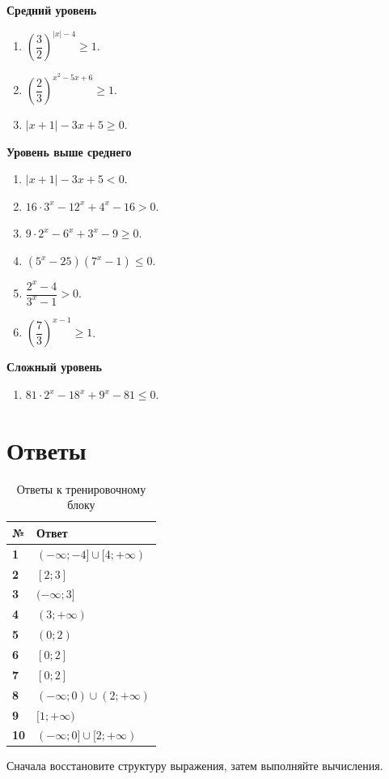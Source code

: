 \documentclass[a4paper,12pt]{article}
\begin{document}
\textbf{Средний уровень}
\begin{enumerate}
  \item $\left(\dfrac32\right)^{|x|-4}\ge1$.
  \item $\left(\dfrac23\right)^{x^2-5x+6}\ge1$.
  \item $|x+1|-3x+5\ge0$.
\end{enumerate}

\textbf{Уровень выше среднего}
\begin{enumerate}[resume]
  \item $|x+1|-3x+5<0$.
  \item $16\cdot3^x-12^x+4^x-16>0$.
  \item $9\cdot2^x-6^x+3^x-9\ge0$.
  \item $(5^x-25)(7^x-1)\le0$.
  \item $\dfrac{2^x-4}{3^x-1}>0$.
  \item $\left(\dfrac73\right)^{x-1}\ge1$.
\end{enumerate}

\textbf{Сложный уровень}
\begin{enumerate}[resume]
  \item $81\cdot2^x-18^x+9^x-81\le0$.
\end{enumerate}

\newpage
\section{Ответы}

\begin{table}[ht]
\centering
\caption{Ответы к тренировочному блоку}
\begin{tabularx}{\linewidth}{>{\bfseries}p{12mm} X}
\toprule
№ & Ответ \\
\midrule
1 & $(-\infty;-4]\cup[4;+\infty)$ \\
2 & $[2;3]$ \\
3 & $(-\infty;3]$ \\
4 & $(3;+\infty)$ \\
5 & $(0;2)$ \\
6 & $[0;2]$ \\
7 & $[0;2]$ \\
8 & $(-\infty;0)\cup(2;+\infty)$ \\
9 & $[1;+\infty)$ \\
10 & $(-\infty;0]\cup[2;+\infty)$ \\
\bottomrule
\end{tabularx}
\end{table}

\vfill
\begin{center}
\textcolor{softgray}{Сначала восстановите структуру выражения, затем выполняйте вычисления.}
\end{center}
\end{document}
